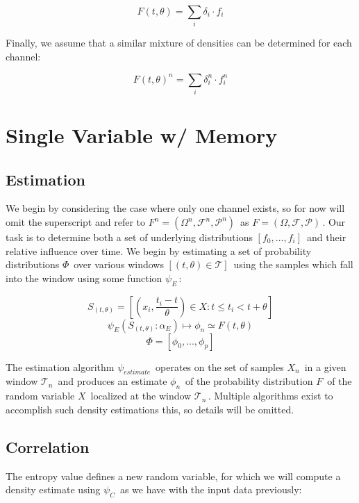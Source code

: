 \documentclass[10pt]{article}
\begin{document}
\begin{equation} F(t,\theta) = \sum_i \delta_i \cdot f_i \end{equation}

Finally, we assume that a similar mixture of densities can be determined for each channel:

\begin{equation} F(t,\theta)^n = \sum_i \delta_i^n \cdot f_i^n \end{equation}

\section{Single Variable w/ Memory}
\subsection{Estimation}
We begin by considering the case where only one channel exists, so for now will omit the superscript and refer to \(F^n = (\Omega^n,\mathcal{F}^n,\mathcal{P}^n) \,\!\) as \(F = (\Omega, \mathcal{F},\mathcal{P}) \,\!\).  Our task is to determine both a set of underlying distributions \([f_0,...,f_i] \,\!\) and their relative influence over time.  We begin by estimating a set of probability distributions \(\Phi \,\!\) over various windows \([(t,\theta) \in \mathcal{T} ] \,\!\) using the samples which fall into the window using some function \(\psi_E \,\!\):

\begin{equation} S_{(t,\theta)} = \left[ \left( x_i,\frac{t_i - t}{\theta} \right) \in X : t \le t_i < t+\theta \right] \end{equation}
\begin{equation} \psi_E( S_{(t,\theta)}:\alpha_E ) \mapsto \phi_n \simeq F(t,\theta)  \end{equation}
\[ \Phi = [\phi_0,...,\phi_p ] \nonumber \]

The estimation algorithm \(\psi_{estimate} \,\!\) operates on the set of samples \(X_n \,\!\) in a given window \(\mathcal{T}_n \,\!\) and produces an estimate \(\phi_n \,\!\) of the probability distribution \(F \,\!\) of the random variable \(X \,\!\) localized at the window \(\mathcal{T}_n \,\!\).  Multiple algorithms exist to accomplish such density estimations this, so details will be omitted.

\subsection{Correlation}
The entropy value defines a new random variable, for which we will compute a density estimate using \(\psi_C \,\!\) as we have with the input data previously:
\end{document}
